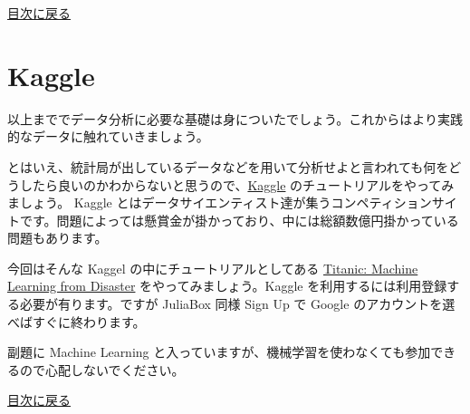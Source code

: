 \documentclass[a4paper,dvipdfmx,uplatex]{jsarticle}
\begin{document}
    \protect\hyperlink{ux76eeux6b21}{目次に戻る}

    \section{Kaggle}\label{kaggle}

以上まででデータ分析に必要な基礎は身についたでしょう。これからはより実践的なデータに触れていきましょう。

とはいえ、統計局が出しているデータなどを用いて分析せよと言われても何をどうしたら良いのかわからないと思うので、\href{https://www.kaggle.com/}{Kaggle}
のチュートリアルをやってみましょう。 Kaggle
とはデータサイエンティスト達が集うコンペティションサイトです。問題によっては懸賞金が掛かっており、中には総額数億円掛かっている問題もあります。

今回はそんな Kaggel の中にチュートリアルとしてある
\href{https://www.kaggle.com/c/titanic}{Titanic: Machine Learning from
Disaster} をやってみましょう。Kaggle
を利用するには利用登録する必要が有ります。ですが JuliaBox 同様 Sign Up
で Google のアカウントを選べばすぐに終わります。

副題に Machine Learning
と入っていますが、機械学習を使わなくても参加できるので心配しないでください。

    \protect\hyperlink{ux76eeux6b21}{目次に戻る}


    
    
    
    
\end{document}
